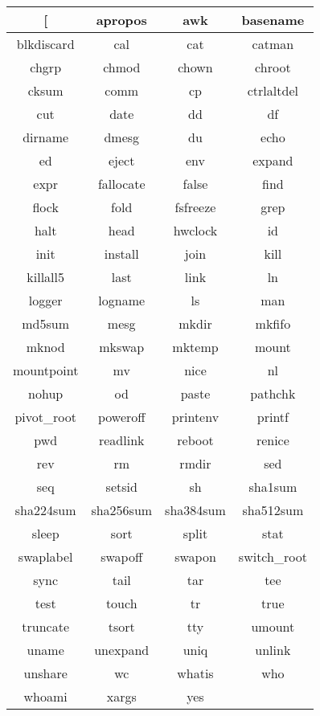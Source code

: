 \begin{center}
    \begin{tabular}{|c|c|c|c|}
        \hline
        [ & apropos & awk & basename \\
        \hline
        blkdiscard & cal & cat & catman \\
        \hline
        chgrp & chmod & chown & chroot \\
        \hline
        cksum & comm & cp & ctrlaltdel \\
        \hline
        cut & date & dd & df \\
        \hline
        dirname & dmesg & du & echo \\
        \hline
        ed & eject & env & expand \\
        \hline
        expr & fallocate & false & find \\
        \hline
        flock & fold & fsfreeze & grep \\
        \hline
        halt & head & hwclock & id \\
        \hline
        init & install & join & kill \\
        \hline
        killall5 & last & link & ln \\
        \hline
        logger & logname & ls & man \\
        \hline
        md5sum & mesg & mkdir & mkfifo \\
        \hline
        mknod & mkswap & mktemp & mount \\
        \hline
        mountpoint & mv & nice & nl \\
        \hline
        nohup & od & paste & pathchk \\
        \hline
        pivot\_root & poweroff & printenv & printf \\
        \hline
        pwd & readlink & reboot & renice \\
        \hline
        rev & rm & rmdir & sed \\
        \hline
        seq & setsid & sh & sha1sum \\
        \hline
        sha224sum & sha256sum & sha384sum & sha512sum \\
        \hline
        sleep & sort & split & stat \\
        \hline
        swaplabel & swapoff & swapon & switch\_root \\
        \hline
        sync & tail & tar & tee \\
        \hline
        test & touch & tr & true \\
        \hline
        truncate & tsort & tty & umount \\
        \hline
        uname & unexpand & uniq & unlink \\
        \hline
        unshare & wc & whatis & who \\
        \hline
        whoami & xargs & yes \\
        \cline{1-3}
    \end{tabular}
\end{center}

